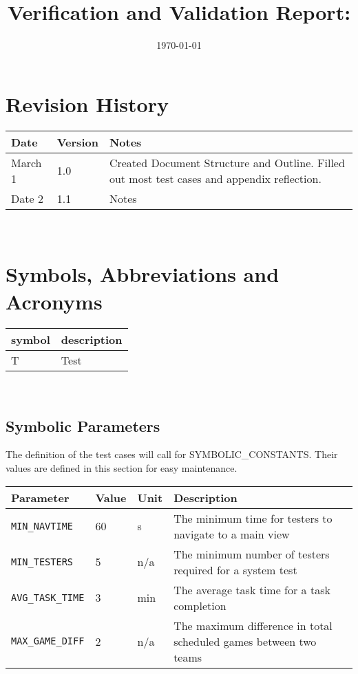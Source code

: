 \documentclass[12pt, titlepage]{article}
\begin{document}
\title{Verification and Validation Report: \progname} 
\author{\authname}
\date{\today}
	
\maketitle


\section{Revision History}

\begin{tabularx}{\textwidth}{p{3cm}p{2cm}X}
  \toprule {\bf Date} & {\bf Version} & {\bf Notes}\\
  \midrule
  March 1 & 1.0 & Created Document Structure and Outline. Filled out most test cases and appendix reflection. \\
  Date 2 & 1.1 & Notes\\
  \bottomrule
  \end{tabularx}

~\newpage

\section{Symbols, Abbreviations and Acronyms}

\renewcommand{\arraystretch}{1.2}
\begin{tabular}{l l} 
  \toprule		
  \textbf{symbol} & \textbf{description}\\
  \midrule 
  T & Test\\
  \bottomrule
\end{tabular}\\

\subsection{Symbolic Parameters}

The definition of the test cases will call for SYMBOLIC\_CONSTANTS.
Their values are defined in this section for easy maintenance.
\begin{longtable}{|l|l|l|p{5cm}|}
    \hline
    Parameter & Value & Unit & Description \\
    \hline
    \label{MIN_NAVTIME} \texttt{MIN\_NAVTIME} & 60 & s & The minimum time for testers to navigate to a main view \\
    \hline
    \label{MIN_TESTERS} \texttt{MIN\_TESTERS} & 5 & n/a & The minimum number of testers required for a system test \\
    \hline
    \label{AVG_TASK_TIME} \texttt{AVG\_TASK\_TIME} & 3 & min & The average task time for a task completion \\
    \hline
    \label{MAX_GAME_DIFF} \texttt{MAX\_GAME\_DIFF} & 2 & n/a & The maximum difference in total scheduled games between two teams \\
    \hline
\end{longtable}
\end{document}
